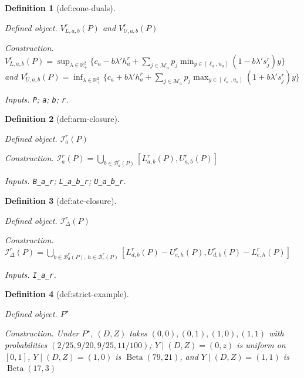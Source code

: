 \documentclass{article}
\newtheorem{definition}{Definition}
\begin{document}
\begin{definition}[def:cone-duals]\label{def:cone-duals}
\par\smallskip\noindent\emph{Defined object.} \(V_{L,a,b}^r(P)\) and \(V_{U,a,b}^r(P)\)
\par\smallskip\noindent\emph{Construction.} \(V_{L,a,b}^r(P)=\sup_{\lambda\in\mathbb R_+^2}\{c_a-b\lambda'h_a^r+\sum_{j\in\mathcal M_a}p_j\min_{y\in[\ell_a,u_a]}(1-b\lambda's_j^r)y\}\) and \(V_{U,a,b}^r(P)=\inf_{\lambda\in\mathbb R_+^2}\{c_a+b\lambda'h_a^r+\sum_{j\in\mathcal M_a}p_j\max_{y\in[\ell_a,u_a]}(1+b\lambda's_j^r)y\}\)
\par\smallskip\noindent\emph{Inputs.} \texttt{P}; \texttt{a}; \texttt{b}; \texttt{r}.
\end{definition}

\begin{definition}[def:arm-closure]\label{def:arm-closure}
\par\smallskip\noindent\emph{Defined object.} \(\mathcal I_a^r(P)\)
\par\smallskip\noindent\emph{Construction.} \(\mathcal I_a^r(P)=\bigcup_{b\in\mathcal B_a^r(P)}[L_{a,b}^r(P),U_{a,b}^r(P)]\)
\par\smallskip\noindent\emph{Inputs.} \texttt{B\_\allowbreak{}a\_\allowbreak{}r}; \texttt{L\_\allowbreak{}a\_\allowbreak{}b\_\allowbreak{}r}; \texttt{U\_\allowbreak{}a\_\allowbreak{}b\_\allowbreak{}r}.
\end{definition}

\begin{definition}[def:ate-closure]\label{def:ate-closure}
\par\smallskip\noindent\emph{Defined object.} \(\mathcal I_{\Delta}^r(P)\)
\par\smallskip\noindent\emph{Construction.} \(\mathcal I_{\Delta}^r(P)=\bigcup_{b\in\mathcal B_d^r(P),\,h\in\mathcal B_e^r(P)}[L_{d,b}^r(P)-U_{e,h}^r(P),U_{d,b}^r(P)-L_{e,h}^r(P)]\)
\par\smallskip\noindent\emph{Inputs.} \texttt{I\_\allowbreak{}a\_\allowbreak{}r}.
\end{definition}

\begin{definition}[def:strict-example]\label{def:strict-example}
\par\smallskip\noindent\emph{Defined object.} \(P^\star\)
\par\smallskip\noindent\emph{Construction.} Under \(P^\star\), \((D,Z)\) takes \((0,0),(0,1),(1,0),(1,1)\) with probabilities \((2/25,9/20,9/25,11/100)\); \(Y\mid(D,Z)=(0,z)\) is uniform on \([0,1]\), \(Y\mid(D,Z)=(1,0)\) is \(\operatorname{Beta}(79,21)\), and \(Y\mid(D,Z)=(1,1)\) is \(\operatorname{Beta}(17,3)\)
\end{definition}
\end{document}
